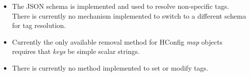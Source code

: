 
\begin{itemize}
\item The JSON schema is implemented and used to resolve non-specific tags.
  There is currently no mechanism implemented to switch to a different schema
  for tag resolution.
\item Currently the only available removal method for HConfig {\em map}
  objects requires that {\em keys} be simple scalar strings.
\item There is currently no method implemented to set or modify tags.
\end{itemize}
